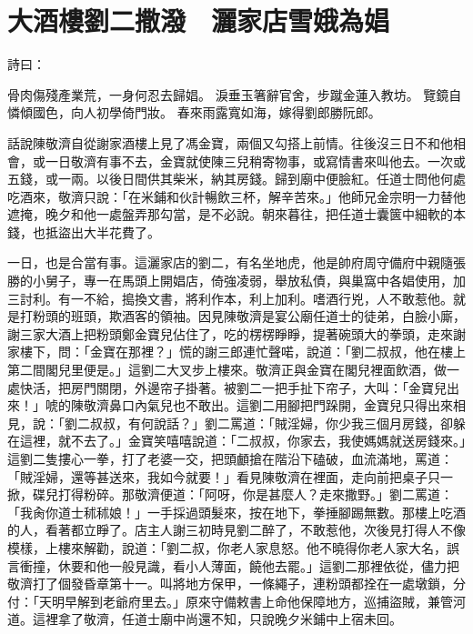 %

\chapter{大酒樓劉二撒潑　灑家店雪娥為娼}

詩曰：

骨肉傷殘產業荒，一身何忍去歸娼。
淚垂玉箸辭官舍，步蹴金蓮入教坊。
覽鏡自憐傾國色，向人初學倚門妝。
春來雨露寬如海，嫁得劉郎勝阮郎。

話說陳敬濟自從謝家酒樓上見了馮金寶，兩個又勾搭上前情。往後沒三日不和他相會，或一日敬濟有事不去，金寶就使陳三兒稍寄物事，或寫情書來叫他去。一次或五錢，或一兩。以後日間供其柴米，納其房錢。歸到廟中便臉紅。任道士問他何處吃酒來，敬濟只說：「在米鋪和伙計暢飲三杯，解辛苦來。」他師兄金宗明一力替他遮掩，晚夕和他一處盤弄那勾當，是不必說。朝來暮往，把任道士囊篋中細軟的本錢，也抵盜出大半花費了。

一日，也是合當有事。這灑家店的劉二，有名坐地虎，他是帥府周守備府中親隨張勝的小舅子，專一在馬頭上開娼店，倚強凌弱，舉放私債，與巢窩中各娼使用，加三討利。有一不給，搗換文書，將利作本，利上加利。嗜酒行兇，人不敢惹他。就是打粉頭的班頭，欺酒客的領袖。因見陳敬濟是宴公廟任道士的徒弟，白臉小廝，謝三家大酒上把粉頭鄭金寶兒佔住了，吃的楞楞睜睜，提著碗頭大的拳頭，走來謝家樓下，問：「金寶在那裡？」慌的謝三郎連忙聲喏，說道：「劉二叔叔，他在樓上第二間閣兒里便是。」這劉二大叉步上樓來。敬濟正與金寶在閣兒裡面飲酒，做一處快活，把房門關閉，外邊帘子掛著。被劉二一把手扯下帘子，大叫：「金寶兒出來！」唬的陳敬濟鼻口內氣兒也不敢出。這劉二用腳把門跺開，金寶兒只得出來相見，說：「劉二叔叔，有何說話？」劉二罵道：「賊淫婦，你少我三個月房錢，卻躲在這裡，就不去了。」金寶笑嘻嘻說道：「二叔叔，你家去，我使媽媽就送房錢來。」這劉二隻摟心一拳，打了老婆一交，把頭顱搶在階沿下磕破，血流滿地，罵道：「賊淫婦，還等甚送來，我如今就要！」看見陳敬濟在裡面，走向前把桌子只一掀，碟兒打得粉碎。那敬濟便道：「阿呀，你是甚麼人？走來撒野。」劉二罵道：「我肏你道士秫秫娘！」一手採過頭髮來，按在地下，拳捶腳踢無數。那樓上吃酒的人，看著都立睜了。店主人謝三初時見劉二醉了，不敢惹他，次後見打得人不像模樣，上樓來解勸，說道：「劉二叔，你老人家息怒。他不曉得你老人家大名，誤言衝撞，休要和他一般見識，看小人薄面，饒他去罷。」這劉二那裡依從，儘力把敬濟打了個發昏章第十一。叫將地方保甲，一條繩子，連粉頭都拴在一處墩鎖，分付：「天明早解到老爺府里去。」原來守備敕書上命他保障地方，巡捕盜賊，兼管河道。這裡拿了敬濟，任道士廟中尚還不知，只說晚夕米鋪中上宿未回。

